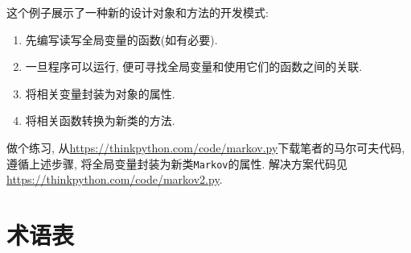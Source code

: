 \documentclass[10pt]{book}
\begin{document}
这个例子展示了一种新的设计对象和方法的开发模式:

\begin{enumerate}

\item 先编写读写全局变量的函数(如有必要).

\item 一旦程序可以运行, 便可寻找全局变量和使用它们的函数之间的关联.

\item 将相关变量封装为对象的属性.

\item 将相关函数转换为新类的方法.

\end{enumerate}

做个练习, 从\url{https://thinkpython.com/code/markov.py}下载笔者的马尔可夫代码, 
遵循上述步骤, 将全局变量封装为新类{\tt Markov}的属性. 
解决方案代码见\url{https://thinkpython.com/code/markov2.py}.



\section{术语表}
\end{document}
